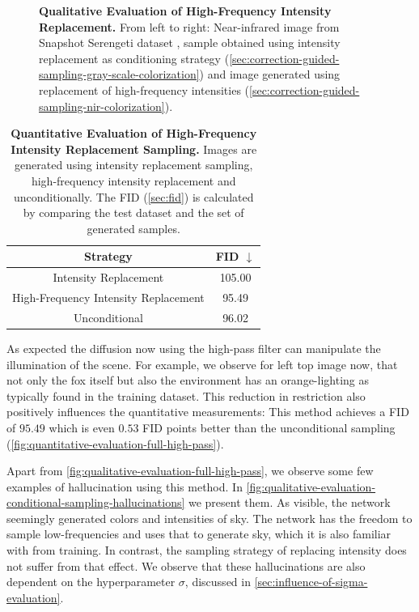 \begin{figure}[htp!]
\begin{tabularx}{\textwidth}{Y Y Y !{\space} Y Y Y}
    \end{tabularx}
    \caption{
        \textbf{Qualitative Evaluation of High-Frequency Intensity Replacement.}
        From left to right:
        Near-infrared image from Snapshot Serengeti dataset \parencite{serengeti},
        sample obtained using intensity replacement as conditioning strategy (\autoref{sec:correction-guided-sampling-gray-scale-colorization})
        and
        image generated using replacement of high-frequency intensities (\autoref{sec:correction-guided-sampling-nir-colorization}).
    }
    \label{fig:qualitative-evaluation-full-high-pass}
\end{figure}

\begin{table}[htp!]
    \centering
    \begin{tabular}{c | c}
        Strategy                             & FID  $\downarrow$ \\
        \hline\hline
        Intensity Replacement                & 105.00            \\
        High-Frequency Intensity Replacement & 95.49             \\
        Unconditional                        & 96.02
    \end{tabular}
    \caption{
        \textbf{Quantitative Evaluation of High-Frequency Intensity Replacement Sampling.}
        Images are generated using intensity replacement sampling, high-frequency intensity replacement and unconditionally.
        The FID (\autoref{sec:fid}) \parencite{ttur} is calculated by comparing the test dataset and the set of generated samples.
    }
    \label{fig:quantitative-evaluation-full-high-pass}
\end{table}


As expected the diffusion now using the high-pass filter can manipulate the illumination of the scene.
For example, we observe for left top image now, that not only the fox itself but also the environment has an orange-lighting as typically found in the training dataset.
This reduction in restriction also positively influences the quantitative measurements:
This method achieves a FID of $95.49$ which is even $0.53$ FID points better than the unconditional sampling (\autoref{fig:quantitative-evaluation-full-high-pass}).

Apart from \autoref{fig:qualitative-evaluation-full-high-pass}, we observe some few examples of hallucination using this method. 
In \autoref{fig:qualitative-evaluation-conditional-sampling-hallucinations} we present them. 
As visible, the network seemingly generated colors and intensities of sky. 
The network has the freedom to sample low-frequencies and uses that to generate sky, which it is also familiar with from training.
In contrast, the sampling strategy of replacing intensity does not suffer from that effect. 
We observe that these hallucinations are also dependent on the hyperparameter $\sigma$, discussed in \autoref{sec:influence-of-sigma-evaluation}.

